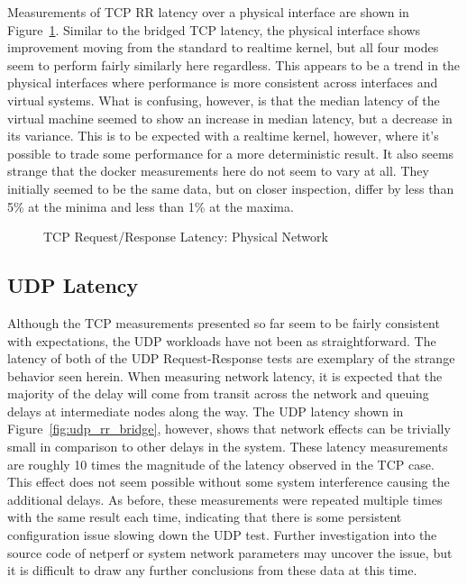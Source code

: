 Measurements of TCP RR latency over a physical interface are shown in Figure~\ref{fig:tcp_rr_phys}.  
Similar to the bridged TCP latency, the physical interface shows improvement moving from the standard to realtime kernel, but all four modes seem to perform fairly similarly here regardless.
This appears to be a trend in the physical interfaces where performance is more consistent across interfaces and virtual systems.
What is confusing, however, is that the median latency of the virtual machine seemed to show an increase in median latency, but a decrease in its variance.  
This is to be expected with a realtime kernel, however, where it's possible to trade some performance for a more deterministic result.  
It also seems strange that the docker measurements here do not seem to vary at all.  
They initially seemed to be the same data, but on closer inspection, differ by less than 5\% at the minima and less than 1\% at the maxima.

\begin{figure}
    \centering
    \def\svgwidth{\columnwidth}
    
    \caption{TCP Request/Response Latency: Physical Network}
    \label{fig:tcp_rr_phys}
\end{figure}

\subsection{UDP Latency} %
\label{sub:udplatency}
Although the TCP measurements presented so far seem to be fairly consistent with expectations, the UDP workloads have not been as straightforward.
The latency of both of the UDP Request-Response tests are exemplary of the strange behavior seen herein.
When measuring network latency, it is expected that the majority of the delay will come from transit across the network and queuing delays at intermediate nodes along the way.  
The UDP latency shown in Figure~\ref{fig:udp_rr_bridge}, however, shows that network effects can be trivially small in comparison to other delays in the system.
These latency measurements are roughly 10 times the magnitude of the latency observed in the TCP case.
This effect does not seem possible without some system interference causing the additional delays.  
As before, these measurements were repeated multiple times with the same result each time, indicating that there is some persistent configuration issue slowing down the UDP test.
Further investigation into the source code of netperf or system network parameters may uncover the issue, but it is difficult to draw any further conclusions from these data at this time.

